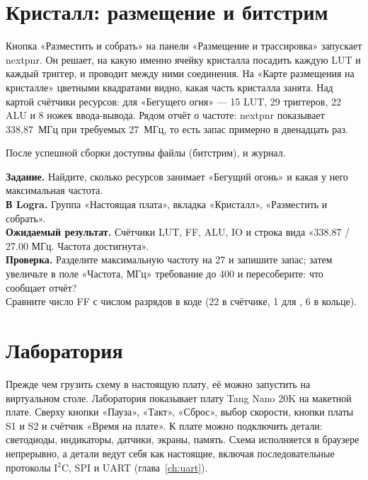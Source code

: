 \section{Кристалл: размещение и битстрим}

Кнопка «Разместить и собрать» на панели «Размещение и трассировка» запускает
nextpnr. Он решает, на какую именно ячейку кристалла посадить каждую LUT и
каждый триггер, и проводит между ними соединения. На «Карте размещения на
кристалле» цветными квадратами видно, какая часть кристалла занята. Над картой
счётчики ресурсов: для «Бегущего огня» --- 15 LUT, 29 триггеров, 22 ALU и 8 ножек
ввода-вывода. Рядом отчёт о частоте: nextpnr показывает 338,87~МГц
при требуемых 27~МГц, то есть запас примерно в двенадцать раз.


После успешной сборки доступны файлы  (битстрим),  и журнал.

\begin{diybox}
\textbf{Задание.} Найдите, сколько ресурсов занимает «Бегущий огонь» и какая у
него максимальная частота.\\
\textbf{В Logra.} Группа «Настоящая плата», вкладка «Кристалл», «Разместить и
собрать».\\
\textbf{Ожидаемый результат.} Счётчики LUT, FF, ALU, IO и строка вида
«338.87 / 27.00 МГц. Частота достигнута».\\
\textbf{Проверка.} Разделите максимальную частоту на 27 и запишите запас;
затем увеличьте в поле «Частота, МГц» требование до 400 и пересоберите: что
сообщает отчёт?\\
 Сравните число FF с числом разрядов в коде (22 в счётчике, 1 для
, 6 в кольце).
\end{diybox}

\section{Лаборатория}

Прежде чем грузить схему в настоящую плату, её можно запустить на
виртуальном столе. Лаборатория показывает плату Tang Nano 20K на макетной
плате. Сверху кнопки «Пауза», «Такт», «Сброс», выбор скорости, кнопки платы
S1 и S2 и счётчик «Время на плате». К плате можно подключить детали:
светодиоды, индикаторы, датчики, экраны, память. Схема исполняется в браузере
непрерывно, а детали ведут себя как настоящие, включая последовательные
протоколы I$^2$C, SPI и UART (глава~\ref{ch:uart}).

